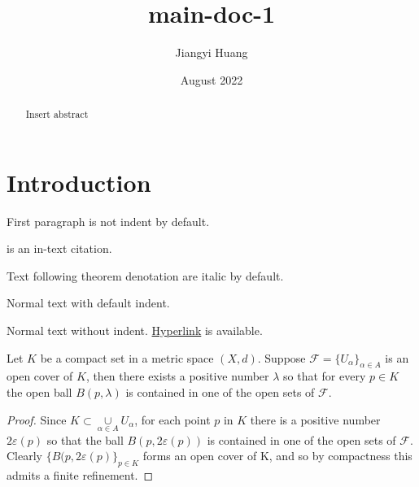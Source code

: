 \documentclass{article}
\title{main-doc-1}
\author{Jiangyi Huang}
\date{August 2022}
\begin{document}
\maketitle

\begin{abstract}
Insert abstract
\end{abstract}


\section{Introduction}

First paragraph is not indent by default.

\mydef \cite{einstein} is an in-text citation.

Text following theorem denotation are italic by default.

\rm %

Normal text with default indent.

\noindent Normal text without indent. \href{https://www.overleaf.com/learn/latex/Hyperlinks}{Hyperlink} is available. 

\thm Let $K$ be a compact set in a metric space $(X,d)$. Suppose $\mathcal{F}=\{U_\alpha\}_{\alpha \in A}$ is an open cover of $K$, then there exists a positive number $\lambda$ so that for every $p \in K$ the open ball $B(p,\lambda)$ is contained in one of the open sets of $\mathcal{F}$.

\begin{proof}

Since $K \subset \underset{\alpha \in A}\cup U_\alpha$, for each point $p$ in $K$ there is a positive number $2\varepsilon(p)$ so that the ball $B(p,2\varepsilon(p))$ is contained in one of the open sets of $\mathcal{F}$. Clearly $\{B(p,2\varepsilon(p)\}_{p \in K}$ forms an open cover of K, and so by compactness this admits a finite refinement.

\end{proof}

\newpage


\end{document}

